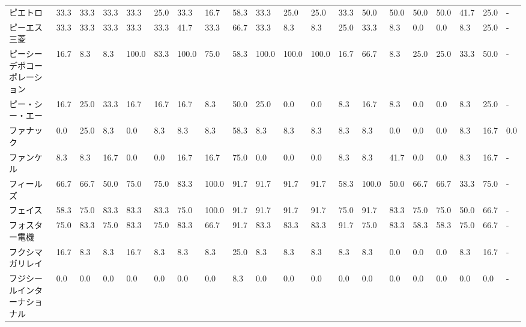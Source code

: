 \documentclass[a4paper，11pt]{jsarticle}
\begin{document}
\begin{longtable}[c]{lp{3mm}p{3mm}p{3mm}p{3mm}p{3mm}p{3mm}p{3mm}p{3mm}p{3mm}p{3mm}p{3mm}p{3mm}p{3mm}p{3mm}p{3mm}p{3mm}p{3mm}p{3mm}p{3mm}}
ピエトロ            &   33.3 &   33.3 &      33.3 &      33.3 &       25.0 &   33.3 &   16.7 &   58.3 &    33.3 &    25.0 &   25.0 &  33.3 &   50.0 &    50.0 &    50.0 &  50.0 &  41.7 &  25.0 &     - \\
ピーエス三菱          &   33.3 &   33.3 &      33.3 &      33.3 &       33.3 &   41.7 &   33.3 &   66.7 &    33.3 &     8.3 &    8.3 &  25.0 &   33.3 &     8.3 &     0.0 &   0.0 &   8.3 &  25.0 &     - \\
ピーシーデポコーポレーション  &   16.7 &    8.3 &       8.3 &     100.0 &       83.3 &  100.0 &   75.0 &   58.3 &   100.0 &   100.0 &  100.0 &  16.7 &   66.7 &     8.3 &    25.0 &  25.0 &  33.3 &  50.0 &     - \\
ピー・シー・エー        &   16.7 &   25.0 &      33.3 &      16.7 &       16.7 &   16.7 &    8.3 &   50.0 &    25.0 &     0.0 &    0.0 &   8.3 &   16.7 &     8.3 &     0.0 &   0.0 &   8.3 &  25.0 &     - \\
ファナック           &    0.0 &   25.0 &       8.3 &       0.0 &        8.3 &    8.3 &    8.3 &   58.3 &     8.3 &     8.3 &    8.3 &   8.3 &    8.3 &     0.0 &     0.0 &   0.0 &   8.3 &  16.7 &   0.0 \\
ファンケル           &    8.3 &    8.3 &      16.7 &       0.0 &        0.0 &   16.7 &   16.7 &   75.0 &     0.0 &     0.0 &    0.0 &   8.3 &    8.3 &    41.7 &     0.0 &   0.0 &   8.3 &  16.7 &     - \\
フィールズ           &   66.7 &   66.7 &      50.0 &      75.0 &       75.0 &   83.3 &  100.0 &   91.7 &    91.7 &    91.7 &   91.7 &  58.3 &  100.0 &    50.0 &    66.7 &  66.7 &  33.3 &  75.0 &     - \\
フェイス            &   58.3 &   75.0 &      83.3 &      83.3 &       83.3 &   75.0 &  100.0 &   91.7 &    91.7 &    91.7 &   91.7 &  75.0 &   91.7 &    83.3 &    75.0 &  75.0 &  50.0 &  66.7 &     - \\
フォスター電機         &   75.0 &   83.3 &      75.0 &      83.3 &       75.0 &   83.3 &   66.7 &   91.7 &    83.3 &    83.3 &   83.3 &  91.7 &   75.0 &    83.3 &    58.3 &  58.3 &  75.0 &  66.7 &     - \\
フクシマガリレイ        &   16.7 &    8.3 &       8.3 &      16.7 &        8.3 &    8.3 &    8.3 &   25.0 &     8.3 &     8.3 &    8.3 &   8.3 &    8.3 &     0.0 &     0.0 &   0.0 &   8.3 &  16.7 &     - \\
フジシールインターナショナル  &    0.0 &    0.0 &       0.0 &       0.0 &        0.0 &    0.0 &    0.0 &    8.3 &     0.0 &     0.0 &    0.0 &   0.0 &    0.0 &     0.0 &     0.0 &   0.0 &   0.0 &   0.0 &     - \\

\end{longtable}
\end{document}
